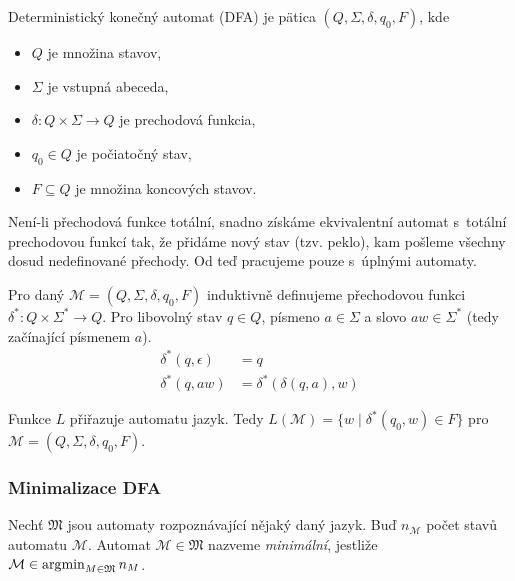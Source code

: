 \begin{definition}
    Deterministický konečný automat (DFA) je pätica $(Q, \Sigma, \delta, q_0, F)$, kde
    \begin{itemize}
		\item $Q$ je množina stavov,
		\item $\Sigma$ je vstupná abeceda,
		\item $\delta: Q \times \Sigma \to Q$ je prechodová funkcia,
		\item $q_0 \in Q$ je počiatočný stav,
		\item $F \subseteq Q$ je množina koncových stavov.
	\end{itemize}
\end{definition}

Není-li přechodová funkce totální, snadno získáme ekvivalentní automat
s~totální prechodovou funkcí tak, že přidáme nový stav (tzv. peklo), kam pošleme
všechny dosud nedefinované přechody. Od teď pracujeme pouze s~úplnými
automaty.

\begin{definition}
    Pro daný $\mathcal{M} = (Q, \Sigma, \delta, q_0, F)$
    induktivně definujeme přechodovou funkci
    $\delta^* : Q \times \Sigma^* \to Q$.
    Pro libovolný stav $q \in Q$, písmeno $a \in \Sigma$ a
    slovo $aw \in \Sigma^*$ (tedy začínající písmenem $a$).
\begin{align*}
    \delta^*(q, \epsilon) &= q \\
    \delta^*(q, aw) &= \delta^*(\delta(q,a), w)
\end{align*}
\end{definition}

\begin{definition}
    Funkce $L$ přiřazuje automatu jazyk. Tedy
    $L(\mathcal{M}) = \{ w \mid \delta^*(q_0, w) \in F \}$
    pro $\mathcal{M} = (Q, \Sigma, \delta, q_0, F)$.
\end{definition}

\subsubsection{Minimalizace DFA}

\begin{definition}
    Nechť $\mathfrak{M}$ jsou automaty rozpoznávající nějaký daný jazyk.
    Buď $n_\mathcal{M}$ počet stavů automatu $\mathcal{M}$.
    Automat $\mathcal{M} \in \mathfrak{M}$ nazveme {\em minimální},
    jestliže $\mathcal{M} \in \operatorname*{\arg\!\min}_{M \in \mathfrak{M}} n_M$.
\end{definition}

